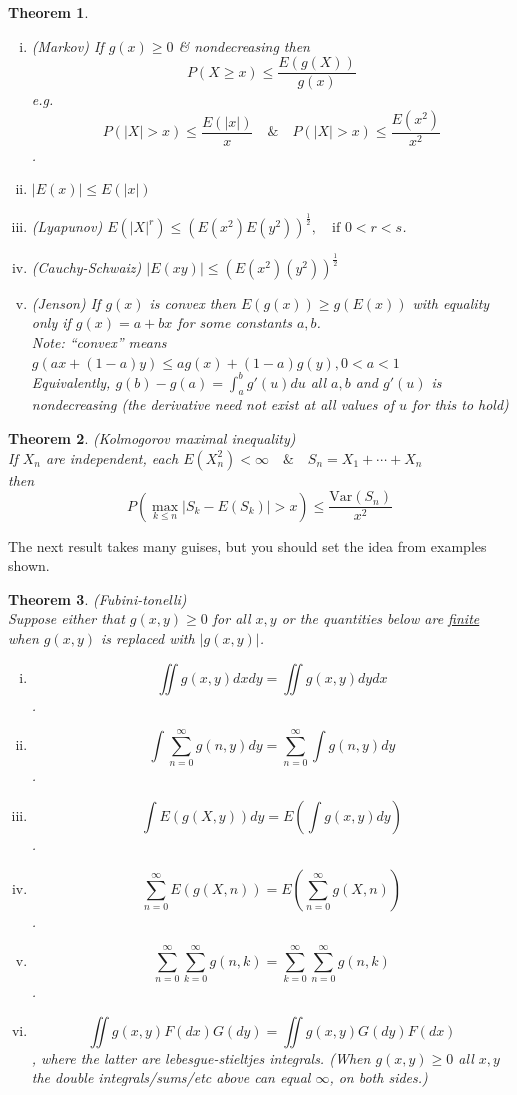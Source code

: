 \documentclass[12pt]{article}
\theoremstyle{definition}
\theoremstyle{plain}
\newtheorem{mythm}{Theorem}[section]
\begin{document}
\begin{mythm} 
$\mbox{}$
\begin{enumerate}[(i)]
\item (Markov) If $g(x) \geq 0$ \& nondecreasing then \[P(X \geq x) \leq \frac{E(g(X))}{g(x)}\]  e.g. \[P(|X| >x) \leq \frac{E(|x|)}{x} \quad \& \quad P(|X| > x) \leq \frac{E(x^2)}{x^2}\].
\item $|E(x)| \leq E(|x|)$
\item (Lyapunov) $E(|X|^r) \leq (E(x^2)E(y^2))^{\frac{1}{2}}, \quad \text{if $0 < r <s$}$.
\item (Cauchy-Schwaiz) $|E(xy)| \leq (E(x^2)(y^2))^{\frac{1}{2}}$
\item (Jenson) If $g(x)$ is convex then $E(g(x)) \geq g(E(x))$ with equality only if $g(x)=a + bx$ for some constants $a,b$. \\
Note: ``convex'' means $g(ax+(1-a)y) \leq ag(x) + (1-a)g(y),0 < a < 1$ \\
Equivalently, $g(b) - g(a) = \int_{a}^{b}g'(u)du$ all $a,b$ and $g'(u)$ is nondecreasing (the derivative need not exist at all values of $u$ for this to hold)
\end{enumerate}
\end{mythm}
\begin{mythm}
(Kolmogorov maximal inequality) \\
If $X_n$ are independent, each $E(X_n^2) < \infty \quad \& \quad S_n = X_1 + \cdots + X_n$ \\
then \[P(\underset{k \leq n}{\max}|S_k - E(S_k)| > x) \leq \frac{\mathrm{Var}(S_n)}{x^2}\]
\end{mythm}
The next result takes many guises, but you should set the idea from examples shown.

\begin{mythm}
(Fubini-tonelli) \\
Suppose either that $g(x,y) \geq 0$ for all $x,y$ or the quantities below are \underline{finite} when $g(x,y)$ is replaced with $|g(x,y)|$.
\begin{enumerate}[(i)]
\item \[\iint g(x,y)dxdy = \iint g(x,y)dydx\].
\item \[\int \sum_{n=0}^\infty g(n,y)dy = \sum_{n=0}^\infty \int g(n,y) dy\].
\item \[\int E(g(X,y))dy = E(\int g(x,y)dy)\].
\item \[\sum_{n=0}^\infty E(g(X,n)) = E(\sum_{n=0}^\infty g(X,n))\].
\item \[\sum_{n=0}^\infty \sum_{k=0}^\infty g(n,k) = \sum_{k=0}^\infty \sum_{n=0}^\infty g(n,k)\].
\item \[\iint g(x,y)F(dx)G(dy) = \iint g(x,y)G(dy)F(dx)\], where the latter are lebesgue-stieltjes integrals. (When $g(x,y) \geq 0$ all $x,y$ the double integrals/sums/etc above can equal $\infty$, on both sides.)
\end{enumerate}
\end{mythm}
\end{document}
